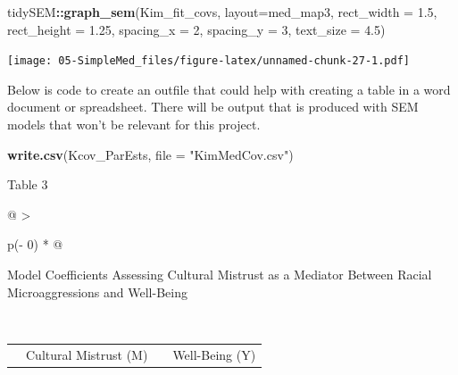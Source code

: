 \documentclass[
  11pt,
]{book}
\newenvironment{Shaded}{\begin{snugshade}}{\end{snugshade}}
\newcommand{\AttributeTok}[1]{\textcolor[rgb]{0.27,0.27,0.27}{#1}}
\newcommand{\DecValTok}[1]{\textcolor[rgb]{0.06,0.06,0.06}{#1}}
\newcommand{\FloatTok}[1]{\textcolor[rgb]{0.06,0.06,0.06}{#1}}
\newcommand{\FunctionTok}[1]{\textcolor[rgb]{0.27,0.27,0.27}{\textbf{#1}}}
\newcommand{\NormalTok}[1]{#1}
\newcommand{\SpecialCharTok}[1]{\textcolor[rgb]{0.43,0.43,0.43}{\textbf{#1}}}
\newcommand{\StringTok}[1]{\textcolor[rgb]{0.5,0.5,0.5}{#1}}
\begin{document}
\begin{Shaded}
\begin{Highlighting}[]
\NormalTok{tidySEM}\SpecialCharTok{::}\FunctionTok{graph\_sem}\NormalTok{(Kim\_fit\_covs, }\AttributeTok{layout=}\NormalTok{med\_map3,  }\AttributeTok{rect\_width =} \FloatTok{1.5}\NormalTok{, }\AttributeTok{rect\_height =} \FloatTok{1.25}\NormalTok{, }\AttributeTok{spacing\_x =} \DecValTok{2}\NormalTok{, }\AttributeTok{spacing\_y =} \DecValTok{3}\NormalTok{, }\AttributeTok{text\_size =} \FloatTok{4.5}\NormalTok{)}
\end{Highlighting}
\end{Shaded}

\texttt{[image: 05-SimpleMed\_files/figure-latex/unnamed-chunk-27-1.pdf]}

Below is code to create an outfile that could help with creating a table in a word document or spreadsheet. There will be output that is produced with SEM models that won't be relevant for this project.

\begin{Shaded}
\begin{Highlighting}[]
\FunctionTok{write.csv}\NormalTok{(Kcov\_ParEsts, }\AttributeTok{file =} \StringTok{"KimMedCov.csv"}\NormalTok{)}
\end{Highlighting}
\end{Shaded}

Table 3

\begin{longtable}[]{@{}
  >{\raggedright\arraybackslash}p{(\columnwidth - 0\tabcolsep) * }@{}}
\toprule\noalign{}
\begin{minipage}[b]{\linewidth}\raggedright
Model Coefficients Assessing Cultural Mistrust as a Mediator Between Racial Microaggressions and Well-Being
\end{minipage} \\
\midrule\noalign{}
\endhead
\bottomrule\noalign{}
\endlastfoot
\end{longtable}

\begin{longtable}[]{@{}
  >{\raggedright\arraybackslash}p{}
  >{\centering\arraybackslash}p{}
  >{\centering\arraybackslash}p{}
  >{\centering\arraybackslash}p{}@{}}
\toprule\noalign{}
\endhead
\bottomrule\noalign{}
\endlastfoot
& Cultural Mistrust (M) & & Well-Being (Y) \\
\end{longtable}
\end{document}
